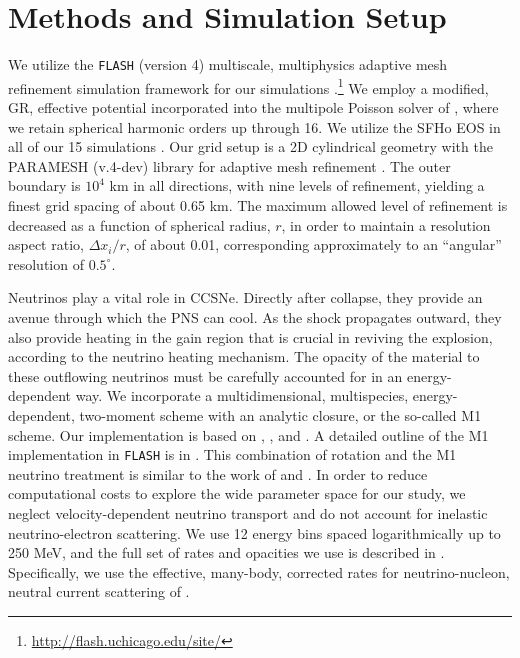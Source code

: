 \documentclass[twocolumn,times]{aastex62}  %
\begin{document}

\section{Methods and Simulation Setup}
\label{sec:method}
We utilize the \texttt{FLASH} (version 4) multiscale, multiphysics adaptive mesh refinement simulation framework for our simulations \citep{fryxell:2000,dubey:2009}.\footnote[7]{\url{http://flash.uchicago.edu/site/}}  We employ a modified, GR, effective potential \citep{marek:2006, oconnor:2018} incorporated into the multipole Poisson solver of \citet{couch:2013a}, where we retain spherical harmonic orders up through 16.   We utilize the SFHo EOS in all of our 15 simulations \citep{steiner:2013}.  Our grid setup is a 2D cylindrical geometry with the PARAMESH (v.4-dev) library for adaptive mesh refinement  \citep{macneice:2000}.  The outer boundary is $10^4$ km in all directions, with nine levels of refinement, yielding a finest grid spacing of about 0.65 km.
The maximum allowed level of refinement is decreased as a function of spherical radius, $r$, in order to maintain a resolution aspect ratio, $\Delta x_i / r$, of about 0.01, corresponding approximately to an ``angular'' resolution of $0.5^{\circ}$.

Neutrinos play a vital role in CCSNe.  Directly after collapse, they provide an avenue through which the PNS can cool.  As the shock propagates outward, they also provide heating in the gain region that is crucial in reviving the explosion, according to the neutrino heating mechanism.  The opacity of the material to these outflowing neutrinos must be carefully accounted for in an energy-dependent way.  We incorporate a multidimensional, multispecies, energy-dependent, two-moment scheme with an analytic closure, or the so-called M1 scheme.  Our implementation is based on \citet{oconnor:2015}, \citet{shibata:2011}, and \citet{cardall:2013}.  A detailed outline of the M1 implementation in \texttt{FLASH} is in \citet{oconnor:2018}.  This combination of rotation and the M1 neutrino treatment is similar to the work of \citet{obergaulinger:2017} and \citet{obergaulinger:2018}.  In order to reduce computational costs to explore the wide parameter space for our study, we neglect velocity-dependent neutrino transport and do not account for inelastic neutrino-electron scattering.
We use 12 energy bins spaced logarithmically up to 250 MeV, and the full set of rates and opacities we use is described in \citet{oconnor:2017a}. 
Specifically, we use the effective, many-body, corrected rates
for neutrino-nucleon, neutral current scattering of \citet{horowitz:2017}.  
\end{document}
